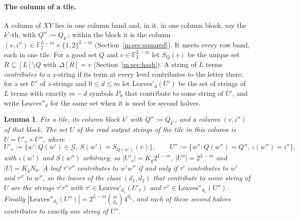 \documentclass[11pt]{article}
\newtheorem{lemma}[theorem]{Lemma}
\theoremstyle{definition}
\theoremstyle{remark}
\newcommand{\F}{\mathbb{F}_2}
\newcommand{\Leaves}{\mathrm{Leaves}}
\newcommand{\Nz}{N_0}
\newcommand{\Qg}{\mathcal{G}}
\newcommand{\Kg}{K_{\mathrm g}}
\begin{document}
\paragraph{The column of a tile.} A column of $XY$ lies in one column band and, in it, in one column block, say the $k'$-th, with $Q'':=Q_{k'}$; within the block it is the column $(v,i'')\in\F^{L-m}\times\{1,2\}^{L-m}$ (Section~\ref{m:sec:squared}). It meets every row band, each in one tile. For a good set $Q$ and $v\in\F^{L-m}$ let $S_Q(v)$ be the unique set $R\subseteq[L]\setminus Q$ with $\Delta[R]=v$ (Section~\ref{m:sec:hash}). A string of $L$ terms \emph{contributes to} a $z$-string if its term at every level contributes to the letter there; for a set $U'$ of $z$-strings and $0\le d\le m$ let $\Leaves'_d(U')$ be the set of strings of $L$ terms with exactly $m-d$ symbols $P_0$ that contribute to some string of $U'$, and write $\Leaves''_d$ for the same set when it is used for second halves.

\begin{lemma}\label{m:lem:colprod}
Fix a tile, its column block $k'$ with $Q'':=Q_{k'}$, and a column $(v,i'')$ of that block. The set $U$ of the read output strings of the tile in this column is $U=U'_v\times U''$, where
\[
U'_v:=\{w':Q(w')\in\Qg,\ S(w')=S_{Q(w')}(v)\},\qquad U'':=\{w'':Q(w'')=Q'',\ \iota(w'')=i''\},
\]
with $\iota(w')$ and $S(w'')$ arbitrary; so $|U'_v|=\Kg2^{L-m}$, $|U''|=2^{L-m}$ and $|U|=\Kg\Nz$. A leaf $\tau'\tau''$ contributes to $w'w''$ if and only if $\tau'$ contributes to $w'$ and $\tau''$ to $w''$, so the leaves of the class $(d_1,d_2)$ that contribute to some string of $U$ are the strings $\tau'\tau''$ with $\tau'\in\Leaves'_{d_1}(U'_v)$ and $\tau''\in\Leaves''_{d_2}(U'')$. Finally $|\Leaves''_{d_2}(U'')|=2^{L-m}\binom m{d_2}4^{d_2}$, and each of these second halves contributes to exactly one string of $U''$.
\end{lemma}
\end{document}
